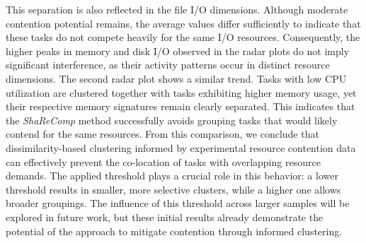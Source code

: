 This separation is also reflected in the file I/O dimensions. Although moderate contention potential remains, the average values differ sufficiently to indicate that these tasks do not compete heavily for the same I/O resources. Consequently, the higher peaks in memory and disk I/O observed in the radar plots do not imply significant interference, as their activity patterns occur in distinct resource dimensions.
The second radar plot shows a similar trend. Tasks with low CPU utilization are clustered together with tasks exhibiting higher memory usage, yet their respective memory signatures remain clearly separated. This indicates that the \textit{ShaReComp} method successfully avoids grouping tasks that would likely contend for the same resources.
From this comparison, we conclude that dissimilarity-based clustering informed by experimental resource contention data can effectively prevent the co-location of tasks with overlapping resource demands. The applied threshold plays a crucial role in this behavior: a lower threshold results in smaller, more selective clusters, while a higher one allows broader groupings. The influence of this threshold across larger samples will be explored in future work, but these initial results already demonstrate the potential of the approach to mitigate contention through informed clustering.

